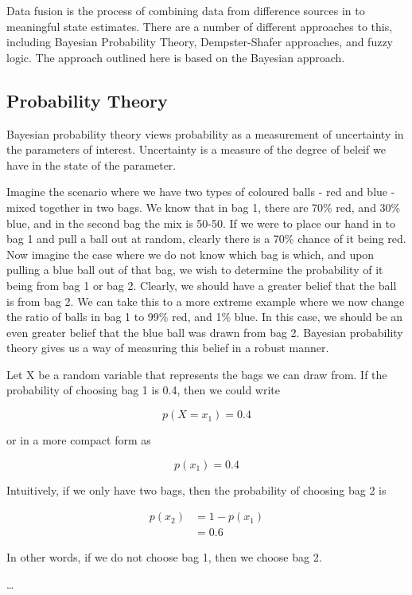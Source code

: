 Data fusion is the process of combining data from difference sources in to meaningful state estimates. There are a number of different approaches to this, including Bayesian Probability Theory, Dempster-Shafer approaches, and fuzzy logic. The approach outlined here is based on the Bayesian approach.

\subsection{Probability Theory}

Bayesian probability theory views  probability as a measurement of uncertainty in the parameters of interest. Uncertainty is a measure of the degree of beleif we have in the state of the parameter. 

Imagine the scenario where we have two types of coloured balls - red and blue - mixed together in two bags. We know that in bag 1, there are 70\% red, and 30\% blue, and in the second bag the mix is 50-50. If we were to place our hand in to bag 1 and pull a ball out at random, clearly there is a 70\% chance of it being red. Now imagine the case where we do not know which bag is which, and upon pulling a blue ball out of that bag, we wish to determine the probability of it being from bag 1 or bag 2. Clearly, we should have a greater belief that the ball is from bag 2. We can take this to a more extreme example where we now change the ratio of balls in bag 1 to 99\% red, and 1\% blue. In this case, we should be an even greater belief that the blue ball was drawn from bag 2. Bayesian probability theory gives us a way of measuring this belief in a robust manner. 

Let X be a random variable that represents the bags we can draw from. If the probability of choosing bag 1 is 0.4, then we could write

\begin{equation}
p(X=x_1)=0.4
\end{equation}

or in a more compact form as 

\begin{equation}
p(x_1)=0.4
\end{equation}

Intuitively, if we only have two bags, then the probability of choosing bag 2 is 

\begin{align}
p(x_2)&=1-p(x_1)\\ 
	  &= 0.6
\end{align}

In other words, if we do not choose bag 1, then we choose bag 2. 

\dots